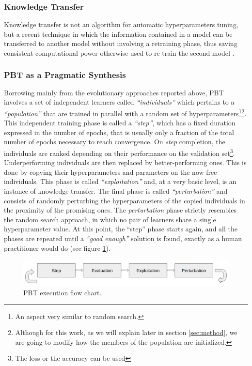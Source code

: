 \documentclass{article}
\begin{document}
	\subsubsection*{Knowledge Transfer}
	Knowledge transfer is not an algorithm for automatic hyperparameters tuning, but a recent technique in which the information contained in a model can be transferred to another model without involving a retraining phase, thus saving consistent computational power otherwise used to re-train the second model \cite{Chen2015Net2NetAL}\cite{Wei:2016:NM:3045390.3045451}.
	
	
    \subsubsection*{PBT as a Pragmatic Synthesis}
    Borrowing mainly from the evolutionary approaches reported above, PBT involves a set of independent learners called \textit{``individuals''} which pertains to a \textit{``population''} that are trained in parallel with a random set of hyperparameters\footnote{An aspect very similar to random search.}\footnote{Although for this work, as we will explain later in section \ref{sec:method}, we are going to modify how the members of the population are initialized.}. This independent training phase is called a \textit{``step''}, which has a fixed duration expressed in the number of epochs, that is usually only a fraction of the total number of epochs necessary to reach convergence. On \textit{step} completion, the individuals are ranked depending on their performance on the validation set\footnote{The loss or the accuracy can be used}. Underperforming individuals are then replaced by better-performing ones. This is done by copying their hyperparameters and parameters on the now free individuals. This phase is called \textit{``exploitation''} and, at a very basic level, is an instance of knowledge transfer.
    The final phase is called \textit{``perturbation''} and consists of randomly perturbing the hyperparameters of the copied individuals in the proximity of the promising ones. The \textit{perturbation} phase strictly resembles the random search approach, in which no pair of learners share a single hyperparameter value. At this point, the ``step'' phase starts again, and all the phases are repeated until a \textit{``good enough''} solution is found, exactly as a human practitioner would do (see figure \ref{fig:PBTStep}).
    
    \begin{figure}[H]
        \label{fig:PBTStep}
        \centering
        \includegraphics[width=\textwidth,height=\textheight,keepaspectratio]{PBT_step}
        \caption{PBT execution flow chart.}
    \end{figure}
    
\end{document}
